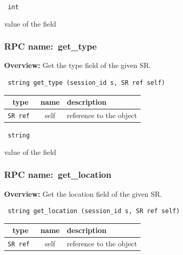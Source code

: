 \vspace{0.3cm}

{\tt 
int
}


value of the field
\vspace{0.3cm}
\vspace{0.3cm}
\vspace{0.3cm}
\subsubsection{RPC name:~get\_type}

{\bf Overview:} 
Get the type field of the given SR.

\begin{verbatim} string get_type (session_id s, SR ref self)\end{verbatim}



 
\vspace{0.3cm}
\begin{tabular}{|c|c|p{7cm}|}
 \hline
{\bf type} & {\bf name} & {\bf description} \\ \hline
{\tt SR ref } & self & reference to the object \\ \hline 

\end{tabular}

\vspace{0.3cm}

{\tt 
string
}


value of the field
\vspace{0.3cm}
\vspace{0.3cm}
\vspace{0.3cm}
\subsubsection{RPC name:~get\_location}

{\bf Overview:} 
Get the location field of the given SR.

\begin{verbatim} string get_location (session_id s, SR ref self)\end{verbatim}



 
\vspace{0.3cm}
\begin{tabular}{|c|c|p{7cm}|}
 \hline
{\bf type} & {\bf name} & {\bf description} \\ \hline
{\tt SR ref } & self & reference to the object \\ \hline 

\end{tabular}

